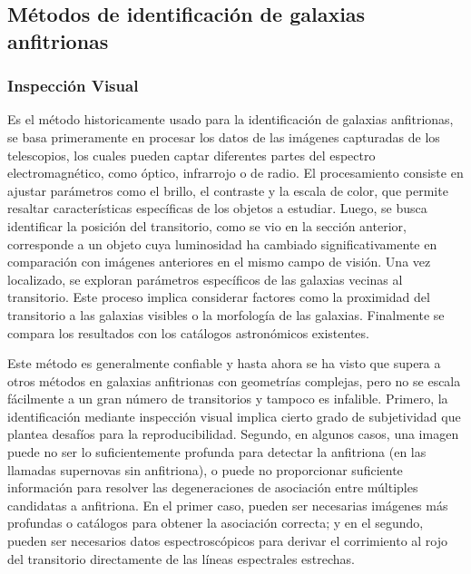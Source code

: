 \documentclass[../tesis.tex]{subfiles}
\begin{document}
\subsection{Métodos de identificación de galaxias anfitrionas}

\subsubsection{Inspección Visual}
Es el método historicamente usado para la identificación de galaxias anfitrionas, se basa primeramente en procesar los datos de las imágenes capturadas de los telescopios, los cuales pueden captar diferentes partes del espectro electromagnético, como óptico, infrarrojo o de radio. El procesamiento consiste en ajustar parámetros como el brillo, el contraste y la escala de color, que permite resaltar características específicas de los objetos a estudiar. Luego, se busca identificar la posición del transitorio, como se vio en la sección anterior, corresponde a un objeto cuya luminosidad ha cambiado significativamente en comparación con imágenes anteriores en el mismo campo de visión. Una vez localizado, se exploran parámetros específicos de las galaxias vecinas al transitorio. Este proceso implica considerar factores como la proximidad del transitorio a las galaxias visibles o la morfología de las galaxias. Finalmente se compara los resultados con los catálogos astronómicos existentes.\par\null\par

Este método es generalmente confiable y hasta ahora se ha visto que supera a otros métodos en galaxias anfitrionas con geometrías complejas, pero no se escala fácilmente a un gran número de transitorios y tampoco es infalible. Primero, la identificación mediante inspección visual implica cierto grado de subjetividad que plantea desafíos para la reproducibilidad. Segundo, en algunos casos, una imagen puede no ser lo suficientemente profunda para detectar la anfitriona (en las llamadas supernovas sin anfitriona), o puede no proporcionar suficiente información para resolver las degeneraciones de asociación entre múltiples candidatas a anfitriona. En el primer caso, pueden ser necesarias imágenes más profundas o catálogos para obtener la asociación correcta; y en el segundo, pueden ser necesarios datos espectroscópicos para derivar el corrimiento al rojo del transitorio directamente de las líneas espectrales estrechas.\par\null\par
\end{document}
